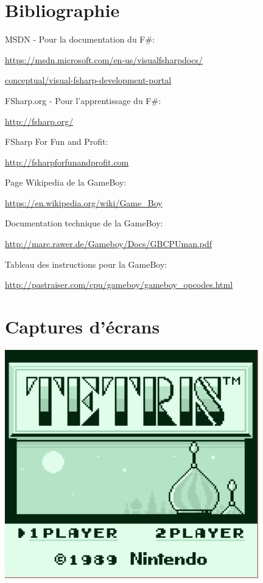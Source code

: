 \documentclass[12pt, a4paper]{article}
\begin{document}
\pagebreak
\section{Bibliographie}
MSDN - Pour la documentation du F\#:

\url{https://msdn.microsoft.com/en-us/visualfsharpdocs/}

\url{conceptual/visual-fsharp-development-portal}

\bigskip
FSharp.org - Pour l'apprentissage du F\#:

\url{http://fsharp.org/}

\bigskip
FSharp For Fun and Profit:

\url{http://fsharpforfunandprofit.com}

\bigskip

Page Wikipedia de la GameBoy:

\url{https://en.wikipedia.org/wiki/Game_Boy}

\bigskip

Documentation technique de la GameBoy:

\url{http://marc.rawer.de/Gameboy/Docs/GBCPUman.pdf}

\bigskip
Tableau des instructions pour la GameBoy:

\url{http://pastraiser.com/cpu/gameboy/gameboy\_opcodes.html}

\pagebreak
\section{Captures d'écrans}

\begin{center}
\includegraphics[width= 11cm]{Capture1.PNG}
\end{center}
\end{document}
